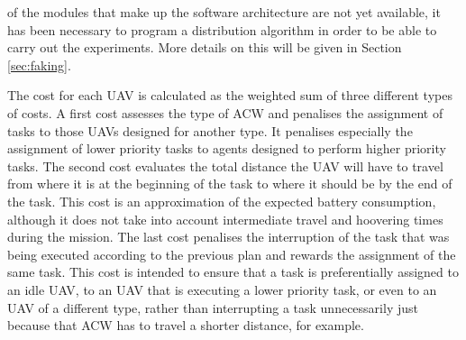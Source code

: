 \documentclass[fontsize=11pt, English=false, Español=true, Myfinal=true, twoside, numbers=noenddot]{scrbook}
\begin{document}
of the modules that make up the software architecture are not yet available, it has been necessary to program a distribution algorithm in order to be able to carry out the experiments. More details on this will be given in Section \ref{sec:faking}.

The cost for each \gls{UAV} is calculated as the weighted sum of three different types of costs. A first cost assesses the type of \gls{ACW} and penalises the assignment of tasks to those \glspl{UAV} designed for another type. It penalises especially the assignment of lower priority tasks to agents designed to perform higher priority tasks. The second cost evaluates the total distance the \gls{UAV} will have to travel from where it is at the beginning of the task to where it should be by the end of the task. This cost is an approximation of the expected battery consumption, although it does not take into account intermediate travel and hoovering times during the mission. The last cost penalises the interruption of the task that was being executed according to the previous plan and rewards the assignment of the same task. This cost is intended to ensure that a task is preferentially assigned to an idle \gls{UAV}, to an \gls{UAV} that is executing a lower priority task, or even to an \gls{UAV} of a different type, rather than interrupting a task unnecessarily just because that \gls{ACW} has to travel a shorter distance, for example.
\end{document}

